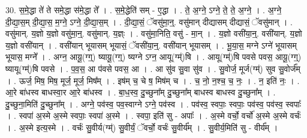\documentclass[17pt]{extarticle}
\begin{document}
30. स॒मे॒द्धा ते॑ ते समे॒द्धा स॑मे॒द्धा ते᳚ । . स॒मे॒द्धेति॑ सम् - ए॒द्धा । . ते॒ अ॒ग्ने॒ ऽग्ने॒ ते॒ ते॒ अ॒ग्ने॒ । . अ॒ग्ने॒ दी॒द्या॒स॒म् दी॒द्या॒स॒ म॒ग्ने॒ ऽग्ने॒ दी॒द्या॒स॒म् । . दी॒द्या॒सं॒ ॅवसु॑मा॒न्॒. वसु॑मान् दीद्यासम् दीद्यासं॒ ॅवसु॑मान् । . वसु॑मान्. य॒ज्ञो य॒ज्ञो वसु॑मा॒न्॒. वसु॑मान्. य॒ज्ञ्ः । . वसु॑मा॒निति॒ वसु॑ - मा॒न् । . य॒ज्ञो वसी॑या॒न्॒. वसी॑यान्. य॒ज्ञो य॒ज्ञो वसी॑यान् । . वसी॑यान् भूयासम् भूयासं॒ ॅवसी॑या॒न्॒. वसी॑यान् भूयासम् । . भू॒या॒स॒ मग्ने ऽग्ने॑ भूयासम् भूयास॒ मग्ने᳚ । . अग्न॒ आयू॒(ग्ग्॒) ष्यायू॒(ग्ग्॒) ष्यग्ने ऽग्न॒ आयू(ग्म्॑)षि । . आयू(ग्म्॑)षि पवसे पवस॒ आयू॒(ग्ग्॒) ष्यायू(ग्म्॑)षि पवसे । . प॒व॒स॒ आ प॑वसे पवस॒ आ । . आ सु॑व सु॒वा सु॑व । . सु॒वोर्ज॒ मूर्ज(ग्म्॑) सुव सु॒वोर्ज᳚म् । . ऊर्ज॒ मिष॒ मिष॒ मूर्ज॒ मूर्ज॒ मिष᳚म् । . इष॑म् च॒ चे ष॒ मिष॑म् च । . च॒ नो॒ न॒श्च॒ च॒ नः॒ । . न॒ इति॑ नः॒ । . आ॒रे बा॑धस्व बाधस्वा॒र आ॒रे बा॑धस्व । . बा॒ध॒स्व॒ दु॒च्छुना᳚म् दु॒च्छुना᳚म् बाधस्व बाधस्व दु॒च्छुना᳚म् । . दु॒च्छुना॒मिति॑ दु॒च्छुना᳚म् । . अग्ने॒ पव॑स्व॒ पव॒स्वाग्ने ऽग्ने॒ पव॑स्व । . पव॑स्व॒ स्वपाः॒ स्वपाः॒ पव॑स्व॒ पव॑स्व॒ स्वपाः᳚ । . स्वपा॑ अ॒स्मे अ॒स्मे स्वपाः॒ स्वपा॑ अ॒स्मे । . स्वपा॒ इति॑ सु - अपाः᳚ । . अ॒स्मे वर्चो॒ वर्चो॑ अ॒स्मे अ॒स्मे वर्चः॑ । . अ॒स्मे इत्य॒स्मे । . वर्चः॑ सु॒वीर्य(ग्म्॑) सु॒वीर्यं॒ ॅवर्चो॒ वर्चः॑ सु॒वीर्य᳚म् । . सु॒वीर्य॒मिति॑ सु - वीर्य᳚म् । \newline
\end{document}
